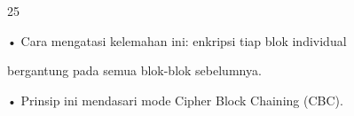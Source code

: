 \documentclass{article}
\begin{document}

25

• Cara mengatasi kelemahan ini:  enkripsi tiap blok individual 

bergantung pada semua blok-blok sebelumnya. 

• Prinsip ini mendasari mode Cipher Block Chaining (CBC).
\end{document}
